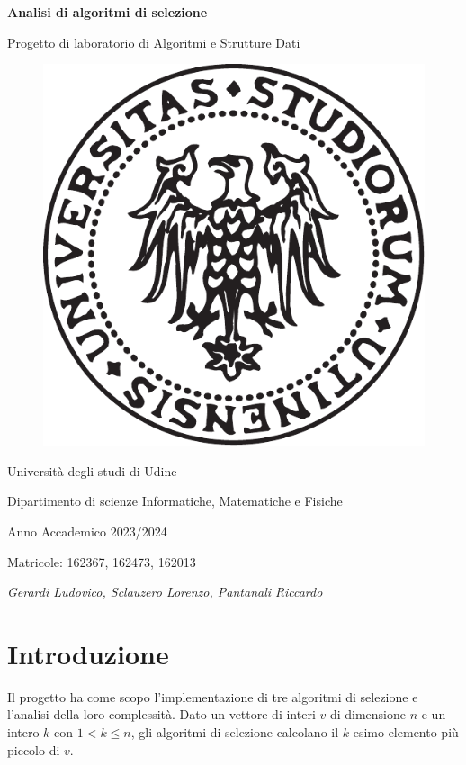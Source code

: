 \documentclass[a4paper]{article}
\begin{document}
\begin{titlepage} %
    \begin{center}
        \vspace*{1cm}
        {\Huge\bfseries Analisi di algoritmi di selezione\par}
        \vspace{.5cm}
        {\LARGE Progetto di laboratorio di Algoritmi e Strutture Dati\par}
        \vspace{1cm}
        \begin{figure}[h]
            \centering
            \includegraphics[width=.5\textwidth]{photo/uniud_logo.pdf}
        \end{figure}
        \vspace{1.5cm}
        {\LARGE Università degli studi di Udine\par}
        {\LARGE Dipartimento di scienze Informatiche, Matematiche e Fisiche\par}
        \vfill
        {\Large Anno Accademico 2023/2024\par}
        {\Large Matricole: 162367, 162473, 162013\par}
        {\Large\itshape Gerardi Ludovico, Sclauzero Lorenzo, Pantanali Riccardo\par}
    \end{center}
\end{titlepage}



\section{Introduzione}
Il progetto ha come scopo l'implementazione di tre algoritmi di selezione e l'analisi della loro complessità. 
Dato un vettore di interi $v$ di dimensione $n$ e un intero $k$ con $1 < k \le n$, gli algoritmi di selezione calcolano il $k$-esimo elemento più piccolo di $v$.
\end{document}
